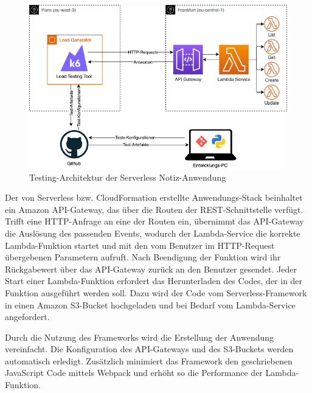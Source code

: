 \begin{figure}[H]
    \includegraphics[width=\textwidth]{img/serverless-testing-architektur.png}
    \caption[Testing-Architektur der Serverless Notiz-Anwendung]{Testing-Architektur der Serverless Notiz-Anwendung}
    \label{fig:serverless-testing-architektur}
\end{figure}

Der von Serverless bzw. CloudFormation erstellte Anwendungs-Stack beinhaltet ein Amazon API-Gateway, das über die Routen der REST-Schnittstelle verfügt. Trifft eine HTTP-Anfrage an eine der Routen ein, übernimmt das API-Gateway die Auslösung des passenden Events, wodurch der Lambda-Service die korrekte Lambda-Funktion startet und mit den vom Benutzer im HTTP-Request übergebenen Parametern aufruft. Nach Beendigung der Funktion wird ihr Rückgabewert über das API-Gateway zurück an den Benutzer gesendet. Jeder Start einer Lambda-Funktion erfordert das Herunterladen des Codes, der in der Funktion ausgeführt werden soll. Dazu wird der Code vom Serverless-Framework in einen Amazon S3-Bucket hochgeladen und bei Bedarf vom Lambda-Service angefordert.

Durch die Nutzung des Frameworks wird die Erstellung der Anwendung vereinfacht. Die Konfiguration des API-Gateways und des S3-Buckets werden automatisch erledigt. Zusätzlich minimiert das Framework den geschriebenen JavaScript Code mittels Webpack und erhöht so die Performance der Lambda-Funktion.

